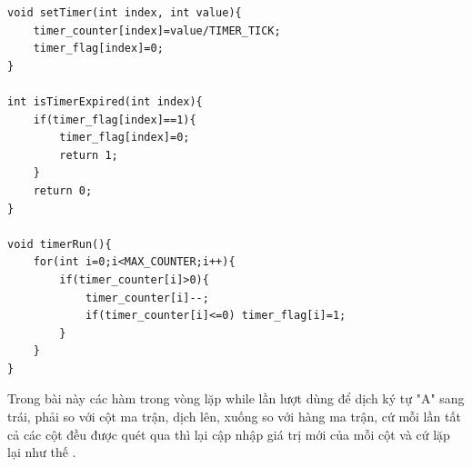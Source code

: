 \begin{lstlisting}[caption=software$\_$timer10.c]
void setTimer(int index, int value){
	timer_counter[index]=value/TIMER_TICK;
	timer_flag[index]=0;
}

int isTimerExpired(int index){
	if(timer_flag[index]==1){
		timer_flag[index]=0;
		return 1;
	}
	return 0;
}

void timerRun(){
	for(int i=0;i<MAX_COUNTER;i++){
		if(timer_counter[i]>0){
			timer_counter[i]--;
			if(timer_counter[i]<=0) timer_flag[i]=1;
		}
	}
}
\end{lstlisting}
Trong bài này các hàm trong vòng lặp while lần lượt dùng để dịch ký tự "A" sang trái, phải so với cột ma trận, dịch lên, xuống so với hàng ma trận, cứ mỗi lần tất cả các cột đều được quét qua thì lại cập nhập giá trị mới của mỗi cột và cứ lặp lại như thế .